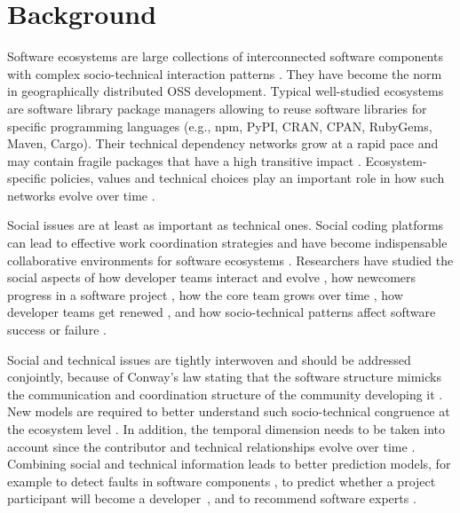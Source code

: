 

\section{Background}

Software ecosystems are large collections of interconnected software components with complex socio-technical interaction patterns \cite{Lungu2009,ManikasHansen2013}. They have become the norm in geographically distributed OSS  development. Typical well-studied ecosystems are software library package managers \cite{Decan2017SANER,Kikas2017,Dietrich2019} allowing to reuse software libraries for specific programming languages (e.g., npm, PyPI, CRAN, CPAN, RubyGems, Maven, Cargo). Their technical dependency networks grow at a rapid pace and may contain fragile packages that have a high transitive impact \cite{Decan2019EMSE}. Ecosystem-specific policies, values and technical choices play an important role in how such networks evolve over time \cite{Bogart2016}.

Social issues are at least as important as technical ones. Social coding platforms can lead to effective work coordination strategies \cite{DabbishSTH12} and have become indispensable collaborative environments for software ecosystems \cite{Herbsleb1999}.
Researchers have studied the social aspects of how developer teams interact and evolve \cite{lopezfernandez2006:sna}, how newcomers progress in a software project \cite{Zhou2011-ICSE,Zhou2012-ICSE}, how the core team grows over time \cite{Robles2009MSR}, how developer teams get renewed \cite{Constantinou2017SANER}, and how socio-technical patterns affect software success or failure \cite{SurianTLCL13}. 

Social and technical issues are tightly interwoven and should be addressed conjointly, because of Conway's law stating that the software structure mimicks the communication and coordination structure of the community developing it \cite{Conway1968, Herbsleb1999, Kwan2011,Blincoe2019}. New models are required to better understand such socio-technical congruence at the ecosystem level \cite{Palyart2018TSE}. In addition, the temporal dimension needs to be taken into account since the contributor and technical relationships evolve over time \cite{Cataldo2008}.
Combining social and technical information leads to better prediction models, for example to detect faults in software components \cite{Bird2009,Bhattacharya2012}, to predict whether a project participant will become a developer~\cite{Gharehyazie2013-ICSM}, and to recommend software experts \cite{Kintab:2014:RSE:2735522.2735526}.

